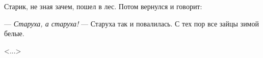 

Старик, не зная зачем, пошел в лес. Потом вернулся и говорит:

--- \textit{Старуха, а старуха!} --- Старуха так и повалилась. С тех пор все зайцы зимой белые.


\vspace{0.5em}
\hfill \textless ...\textgreater